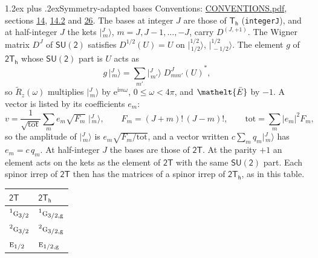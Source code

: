 \documentclass[10pt,a4paper]{article}
\makeatletter
\renewcommand\section{\@startsection{section}{1}{\z@}{-3ex plus -1ex minus -.2ex}%
  {1.2ex plus .2ex}{\normalfont\large\sffamily\bfseries\color{parttitle}}}
\numberwithin{equation}{section}
\newcommand{\eltfont}[1]{{\let\sigma\eltsigma\mathelt{#1}}}
\newcommand{\grp}[1]{\mathsf{#1}}
\newcommand{\irr}[1]{\text{\normalfont\scshape #1}}
\newcommand{\conjpair}[1]{{}^{#1}}
\newcommand{\elt}[1]{\eltfont{#1}}
\newcommand{\ptag}[1]{\mathrm{#1}}
\newcommand{\iunit}{\mathrm{i}}
\newcommand{\expe}{\mathrm{e}}
\newcommand{\irrJp}[2]{D^{(#1,#2)}}
\newcommand{\wignerD}[1]{D^{#1}}
\newcommand{\conj}[1]{{#1}^{*}}
\newcommand{\jm}[2]{\bigl\lvert{}^{#1}_{\,#2}\bigr\rangle}
\newcommand{\barred}[1]{\bar{#1}}
\newcommand{\lift}[1]{\tilde{#1}}
\makeatother
\begin{document}
\section{Symmetry-adapted bases}\label{s:bases}
Conventions: \href{../../CONVENTIONS.pdf}{CONVENTIONS.pdf}, sections \href{../../../rotation/CONVENTIONS.pdf\#conv.14}{14}, \href{../../../rotation/CONVENTIONS.pdf\#conv.14.2}{14.2} and \href{../../CONVENTIONS.pdf\#conv.26}{26}.
\leavevmode\label{n:index.m}\label{n:vector.ket}The bases at integer $J$ are those of \href{../../../rotation/data/pdf/Th.pdf}{$\grp{T_{h}}$} (\texttt{integerJ}), and at half-integer $J$ the kets $\jm{J}{m}$, $m = J, J-1, \dots, -J$, carry $\irrJp{J}{+1}$. \label{n:matrix.wigner}The Wigner matrix $\wignerD{J}$ of $\grp{SU(2)}$ satisfies $\wignerD{1/2}(U) = U$ on $\jm{1/2}{1/2}$, $\jm{1/2}{-1/2}$. The element $g$ of $\grp{2T_{h}}$ whose $\grp{SU(2)}$ part is $U$ acts as
\begin{equation}\label{e:action}g\,\jm{J}{m} = \sum_{m'} \jm{J}{m'}\; \conj{\wignerD{J}_{m m'}(U)},\end{equation}
so $\lift{R}_{z}(\omega)$ multiplies $\jm{J}{m}$ by $\expe^{\iunit m\omega}$, $0 \le \omega < 4\pi$, and $\elt{\barred{E}}$ by $-1$. \label{n:index.ketcoefficient}\label{n:vector.basis.symmetry}\label{n:index.ketweight}\label{n:index.total}A vector is listed by its coefficients $e_m$:
\begin{equation}\label{e:ket}v = \frac{1}{\sqrt{\mathrm{tot}}}\sum_m e_m\sqrt{F_m}\;\jm{J}{m},\qquad F_m = (J+m)!\,(J-m)!,\qquad \mathrm{tot} = \sum_m |e_m|^2F_m,\end{equation}
\leavevmode\label{n:index.factor.c}so the amplitude of $\jm{J}{m}$ is $e_m\sqrt{F_m/\mathrm{tot}}$, and a vector written $c\sum_m q_m\jm{J}{m}$ has $e_m = c\,q_m$.
At half-integer $J$ the bases are those of $\grp{2T}$. At the parity $+1$ an element acts on the kets as the element of $\grp{2T}$ with the same $\grp{SU(2)}$ part. Each spinor irrep of $\grp{2T}$ then has the matrices of a spinor irrep of $\grp{2T_{h}}$, as in this table.
\begin{center}\begin{tabular}{@{}ll@{}}\toprule
$\grp{2T}$ & $\grp{2T_{h}}$\\\midrule
$\conjpair{1}\irr{g}_{3/2}$ & $\conjpair{1}\irr{g}_{3/2,\ptag{g}}$\\
$\conjpair{2}\irr{g}_{3/2}$ & $\conjpair{2}\irr{g}_{3/2,\ptag{g}}$\\
$\irr{e}_{1/2}$ & $\irr{e}_{1/2,\ptag{g}}$\\
\bottomrule\end{tabular}\end{center}
\end{document}
